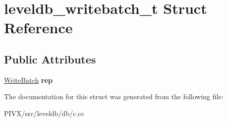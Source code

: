 \hypertarget{structleveldb__writebatch__t}{}\section{leveldb\+\_\+writebatch\+\_\+t Struct Reference}
\label{structleveldb__writebatch__t}
\subsection*{Public Attributes}
\begin{DoxyCompactItemize}
\item 
\mbox{\label{structleveldb__writebatch__t_ac96538c849db578bea786bf29fae6e5f}} 
\mbox{\hyperlink{classleveldb_1_1_write_batch}{Write\+Batch}} {\bfseries rep}
\end{DoxyCompactItemize}


The documentation for this struct was generated from the following file\+:\begin{DoxyCompactItemize}
\item 
P\+I\+V\+X/src/leveldb/db/c.\+cc\end{DoxyCompactItemize}
